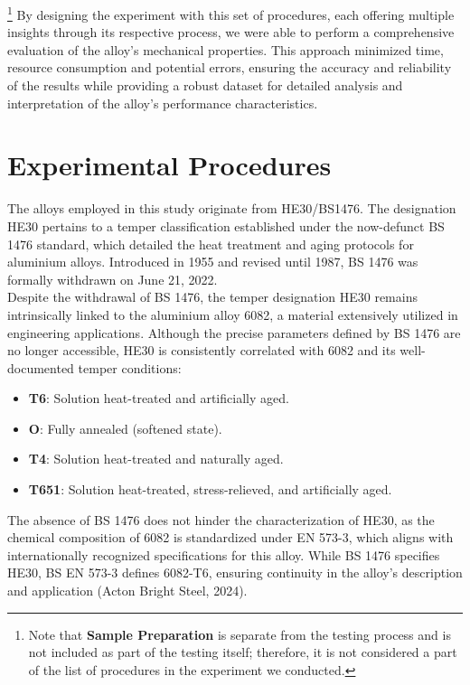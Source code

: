 \documentclass{article}
\begin{document}
\footnote{Note that \textbf{Sample Preparation} is separate from the testing process and is not included as part of the testing itself; therefore, it is not considered a part of the list of procedures in the experiment we conducted.} By designing the experiment with this set of procedures, each offering multiple insights through its respective process, we were able to perform a comprehensive evaluation of the alloy's mechanical properties. This approach minimized time, resource consumption and potential errors, ensuring the accuracy and reliability of the results while providing a robust dataset for detailed analysis and interpretation of the alloy's performance characteristics.

\newpage

\section{Experimental Procedures}
The alloys employed in this study originate from HE30/BS1476. The designation HE30 pertains to a temper classification established under the now-defunct BS 1476 standard, which detailed the heat treatment and aging protocols for aluminium alloys. Introduced in 1955 and revised until 1987, BS 1476 was formally withdrawn on June 21, 2022.\\[8pt]
Despite the withdrawal of BS 1476, the temper designation HE30 remains intrinsically linked to the aluminium alloy 6082, a material extensively utilized in engineering applications. Although the precise parameters defined by BS 1476 are no longer accessible, HE30 is consistently correlated with 6082 and its well-documented temper conditions:
\begin{itemize}[itemsep=1pt]
    \item \textbf{T6}: Solution heat-treated and artificially aged.
    \item \textbf{O}: Fully annealed (softened state).
    \item \textbf{T4}: Solution heat-treated and naturally aged.
    \item \textbf{T651}: Solution heat-treated, stress-relieved, and artificially aged.
\end{itemize}
The absence of BS 1476 does not hinder the characterization of HE30, as the chemical composition of 6082 is standardized under EN 573-3, which aligns with internationally recognized specifications for this alloy. While BS 1476 specifies HE30, BS EN 573-3 defines 6082-T6, ensuring continuity in the alloy's description and application (Acton Bright Steel, 2024).
\end{document}
